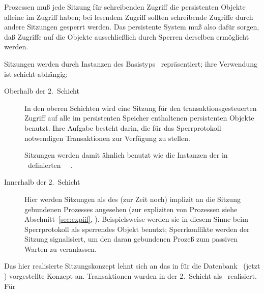 Prozessen mu\ss{} jede Sitzung f\"{u}r schreibenden Zugriff die persistenten
Objekte alleine im Zugriff haben; bei lesendem Zugriff sollten
schreibende Zugriffe durch andere Sitzungen gesperrt werden.  Das
persistente System mu\ss{} also daf\"{u}r sorgen, da\ss{} Zugriffe auf die
Objekte ausschlie\ss{}lich durch Sperren derselben erm\"{o}glicht
werden.
%
\par{}Sitzungen werden durch Instanzen des Basistyps
\ repr\"{a}sentiert; ihre Verwendung ist
schicht-abh\"{a}ngig:
\begin{description}
%
\item[Oberhalb der 2.~Schicht]
In den oberen Schichten wird eine Sitzung f\"{u}r den
trans\-ak\-tions\-ge\-steu\-er\-ten Zugriff auf alle im persistenten
Speicher enthaltenen persistenten Objekte benutzt. Ihre Aufgabe
besteht darin, die f\"{u}r das Sperrprotokoll notwendigen Transaktionen
zur Verf\"{u}gung zu stellen.
%
\par{}Sitzungen werden damit \"{a}hn\-lich benutzt wie die Instanzen der
in \pclos\ definierten
\cls\ \ \cite[]{bib:pa91a}.
%
\item[Innerhalb der 2.~Schicht]
Hier werden Sitzungen als \representation{} des (zur Zeit noch) implizit
an die Sitzung gebundenen Prozesses angesehen (zur expliziten
\representation{} von Prozessen siehe Abschnitt~\ref{sec:expiil},
\citepage{\pageref{sec:expiil}}). Beispielsweise werden 
sie in diesem Sinne beim Sperrprotokoll als sperrendes Objekt
benutzt; Sperrkonflikte werden der Sitzung signalisiert, um
den daran gebundenen Proze\ss{} zum passiven Warten zu veranlassen.
%
\end{description}
%
\iffalse
\par{}Die Wahl des Namens \class{persistent-heap}\ f\"{u}r die
sitzungs-repr\"{a}sentierende \cls\ hat historische Gr\"{u}nde. Bei Beginn
der Systementwicklung hatte genau eine Instanz der
\cls\ \class{persistent-heap}\ in der 3.~und 4.~Schicht die Aufgabe,
den gesamten persistenten Speicher zu repr\"{a}sentieren. Sp\"{a}ter wurde
dann diese \cls\ im Hinblick auf den Zugriff durch mehrere Sitzungen
erweitert, ohne allerdings den Namen der \cls\ zu \"{a}ndern.
\fi
%
\par{}Das hier realisierte Sitzungskonzept lehnt sich an das in
\cite[]{bib:ki89} \cite[]{bib:it91}
\cite[]{bib:ah91} f\"{u}r die Datenbank \orion\ (jetzt
\itasca) vorgestellte Konzept an. Transaktionen wurden in der
2.~Schicht als \ realisiert. F\"{u}r

